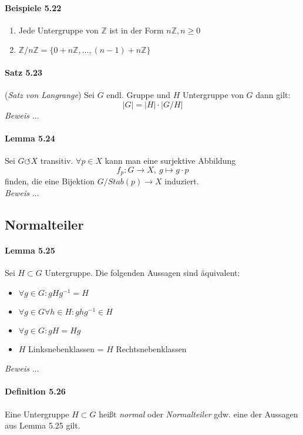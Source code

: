 \documentclass{scrartcl}
\begin{document}
\paragraph{Beispiele 5.22}
\begin{enumerate}
\item Jede Untergruppe von $\mathbb{Z}$ ist in der Form $n\mathbb{Z}, n \geq 0$
\item $\mathbb{Z}/n\mathbb{Z} = \{0 + n\mathbb{Z}, \dots, (n - 1) + n\mathbb{Z}\}$
\end{enumerate}

\paragraph{Satz 5.23} (\textit{Satz von Langrange}) Sei $G$ endl. Gruppe und $H$
Untergruppe von $G$ dann gilt:
\[
  |G| = |H| \cdot |G/H|
\]
\textit{Beweis} $\dots$

\paragraph{Lemma 5.24} Sei $G \circlearrowleft X$ transitiv. $\forall p \in X$
kann man eine surjektive Abbildung
\[
  f_p: G \to X,~g \mapsto g\cdot p
\]
finden, die eine Bijektion $G/Stab(p) \to X$ induziert. \\
\textit{Beweis} $\dots$

\subsection{Normalteiler}
\label{subsec:normalteiler}

\paragraph{Lemma 5.25} Sei $H \subset G$ Untergruppe. Die folgenden Aussagen
sind äquivalent:
\begin{itemize}
\item $\forall g \in G: gHg^{-1} = H$
\item $\forall g \in G \forall h \in H: ghg^{-1} \in H$
\item $\forall g \in G: gH = Hg$
\item $H$ Linksnebenklassen = $H$ Rechtsnebenklassen
\end{itemize}
\textit{Beweis} $\dots$

\paragraph{Definition 5.26} Eine Untergruppe $H \subset G$ heißt \textit{normal}
oder \textit{Normalteiler} gdw. eine der Aussagen aus Lemma 5.25 gilt.
\end{document}
